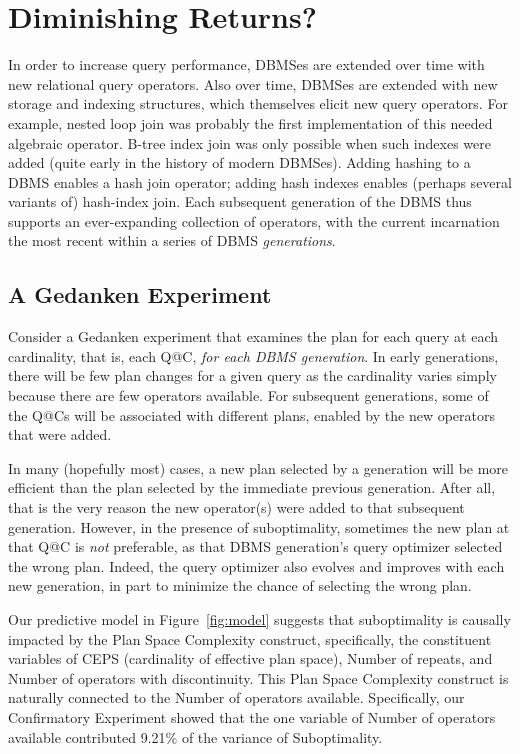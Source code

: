 \documentclass[prodmode,acmtods]{acmsmall}
\begin{document}
\section{Diminishing Returns?}\label{sec:diminishing}
In order to increase query performance, \hbox{DBMSes} are extended over time
with new \hbox{relational} query operators. Also over time, \hbox{DBMSes}
are extended with new storage and indexing structures, which themselves
elicit new query operators. For example, nested loop join was probably the
first implementation of this needed algebraic operator. B-tree index join
was only possible when such indexes were added (quite early in the history
of modern DBMSes). Adding hashing to a DBMS enables a hash join operator;
adding hash indexes enables (perhaps several variants of) hash-index join. Each
subsequent generation of the \hbox{DBMS} thus supports an ever-expanding
collection of operators, with the current incarnation the most recent
within a series of \hbox{DBMS} {\em generations}.

\subsection{A Gedanken Experiment}\label{sec:gedanken}
Consider a Gedanken experiment that examines the plan for each query at
each cardinality, that is, each Q@C, {\em for each \hbox{DBMS} generation}. In early
generations, there will be few plan changes for a given query as the cardinality varies
simply \hbox{because} there are few operators available. For
subsequent generations, some of the Q@Cs will be associated with different plans,
enabled by the new operators that were added.

In many (hopefully most) cases, a new plan selected by a generation will be
more efficient than the plan selected by the immediate previous
generation. After all, that is the very reason the new operator(s) were
added to that subsequent generation.  However, in the presence of
suboptimality, sometimes the new plan at that Q@C is {\em not} preferable,
as that \hbox{DBMS} generation's query optimizer selected the wrong plan.
Indeed, the query optimizer also evolves and improves with each new
generation, in part to minimize the chance of selecting the wrong plan.

Our predictive model in Figure~\ref{fig:model} suggests that suboptimality
is causally impacted by the Plan Space Complexity construct, specifically, the
constituent variables of CEPS (cardinality of effective plan space), Number
of repeats, and 
Number of operators with discontinuity. This Plan Space Complexity construct
is naturally connected to the Number of operators available. Specifically,
our Confirmatory Experiment showed that the one variable of Number of
operators available contributed 9.21\% of the variance of Suboptimality.
\end{document}

